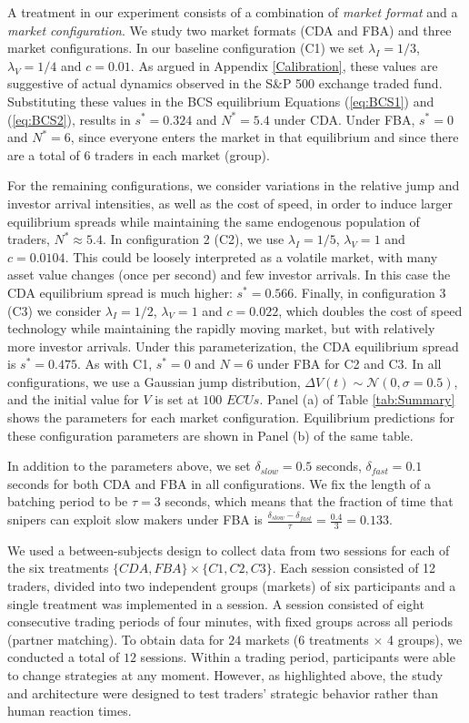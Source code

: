\documentclass[12pt]{article}
\begin{document}
A treatment in our experiment consists of a combination of \textit{market format} and a \textit{market configuration}. We study two market formats (CDA and FBA) and three market configurations. In our baseline configuration (C1)  we set $\lambda_I=1/3$, $\lambda_V=1/4$ and $c=0.01$. As argued in Appendix \ref{Calibration}, these values are suggestive of actual dynamics observed in the S\&P 500 exchange traded fund. Substituting these values in the BCS equilibrium Equations (\ref{eq:BCS1}) and (\ref{eq:BCS2}), results in $s^* =  0.324$ and $N^*=5.4$ under CDA. Under FBA, $s^* = 0$ and $N^*=6$, since everyone enters the market in that equilibrium and since there are a total of 6 traders in each market (group). 

For the remaining configurations, we consider variations in the relative jump and investor arrival intensities, as well as the cost of speed, in order to induce larger equilibrium spreads while maintaining the same endogenous population of traders, $N^* \approx 5.4$. In configuration 2 (C2), we use $\lambda_I=1/5$, $\lambda_V=1$ and $c=0.0104$. This could be loosely interpreted as a volatile market, with many asset value changes (once per second) and few investor arrivals. In this case the CDA equilibrium spread is much higher: $s^* = 0.566$. Finally, in configuration 3 (C3) we consider $\lambda_I=1/2$, $\lambda_V=1$ and $c=0.022$, which doubles the cost of speed technology while maintaining the rapidly moving market, but with relatively more investor arrivals. Under this parameterization, the CDA equilibrium spread is $s^* = 0.475$. As with C1, $s^* = 0$ and $N=6$ under FBA for C2 and C3. 
In all configurations, we use a Gaussian jump distribution, $\Delta V(t) \sim \mathcal{N}(0,\sigma=0.5)$,  and the initial value for $V$ is set  at $100$ $ECUs$. Panel (a) of Table \ref{tab:Summary} shows the parameters for each market configuration. Equilibrium predictions for these configuration parameters are shown in Panel (b) of the same table.

In addition to the parameters above, we set $\delta_{slow} = 0.5$ seconds, $\delta_{fast} = 0.1$ seconds for both CDA and FBA in all configurations. We fix the length of a batching period to be $\tau = 3$ seconds, which means that the fraction of time that snipers can exploit slow makers under FBA is $\frac{\delta_{slow}-\delta_{fast}}{\tau} = \frac{0.4}{3} = 0.133$.

We used a between-subjects design to collect data from two sessions for each of the six treatments $\{ CDA, FBA\} \times \{C1,C2,C3\}$. Each session consisted of 12 traders, divided into two independent groups (markets) of six participants and a single treatment was implemented in a session. A session consisted of eight consecutive trading periods of four minutes, with fixed groups across all periods (partner matching). To obtain data for $24$ markets  ($6$ treatments $\times$ 4 groups), we conducted a total of $12$ sessions. Within a trading period, participants were able to change strategies at any moment. However, as highlighted above, the study and architecture were designed to test traders' strategic behavior rather than human reaction times.
\end{document}
